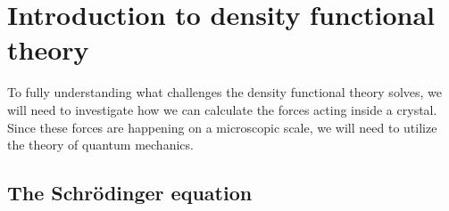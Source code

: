 \begin{comment}
A general wavefunction can be generated by a summation of eigenfunctions (such as the eigenfunction in the latter case)
\begin{align}
\Psi(r,t) = \sum_\kappa c_\kappa \psi_{\kappa}(r,t),
\end{align}
where $c_\kappa$ is a constant. A general wavefunction does not neccessarily describe stationary states, and consequently does not have distinct energies but is rather represented statistically from the expectation value
\begin{align*}
  E = \sum_{\kappa} \lvert c_\kappa \rvert \varepsilon_\kappa.
\end{align*}
Solving Schrödinger equation for a general wavefunction is rather troublesome. Fortunately, we can use the eigenfunctions instead, transforming equation \ref{eq:tise_nesten} into time-independent Schrödinger equation for eigenfunctions
\begin{align}
  \hat{H} \psi_{\kappa}(r) = \varepsilon_\kappa \psi_\kappa(r).
\end{align}

The shape of en eigenfunction has normally high spatial symmetri that depends on the symmetri of the potential $V_{ext}(r)$ and the boundary conditions \cite{Persson2020}. The study of how atoms in a crystalline interact with each other is of upmost importance when trying to explain macroscopic consequences.

\end{comment}
\section{Introduction to density functional theory}

To fully understanding what challenges the density functional theory solves, we will need to investigate how we can calculate the forces acting inside a crystal. Since these forces are happening on a microscopic scale, we will need to utilize the theory of quantum mechanics.



\subsection{The Schrödinger equation}


